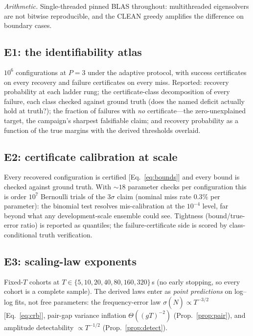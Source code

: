 \documentclass[twocolumn,preprintnumbers,amsmath,amssymb,pra,floatfix]{revtex4-2}
\begin{document}
\emph{Arithmetic.}  Single-threaded pinned BLAS throughout:
multithreaded eigensolvers are not bitwise reproducible, and the
CLEAN greedy amplifies the difference on boundary cases.

\subsection{E1: the identifiability atlas}
\label{sec:ensemble}

$10^{6}$ configurations at $P{=}3$ under the adaptive protocol, with
success certificates on every recovery and failure certificates on
every miss.  Reported: recovery probability at each ladder rung; the
certificate-class decomposition of every failure, each class checked
against ground truth (does the named deficit actually hold at
truth?); the fraction of failures with \emph{no} certificate---the
zero-unexplained target, the campaign's sharpest falsifiable claim;
and recovery probability as a function of the true margins with the
derived thresholds overlaid.






\subsection{E2: certificate calibration at scale}
\label{sec:e2}

Every recovered configuration is certified [Eq.~\eqref{eq:bounds}]
and every bound is checked against ground truth.  With $\sim\!18$
parameter checks per configuration this is order $10^{7}$ Bernoulli
trials of the $3\sigma$ claim (nominal miss rate $0.3\%$ per
parameter): the binomial test resolves mis-calibration at the
$10^{-4}$ level, far beyond what any development-scale ensemble could
see.  Tightness (bound/true-error ratio) is reported as quantiles;
the failure-certificate side is scored by class-conditional truth
verification.






\subsection{E3: scaling-law exponents}
\label{sec:e3}

Fixed-$T$ cohorts at $T\in\{5,10,20,40,80,160,320\}$\,s (no early
stopping, so every cohort is a complete sample).  The derived laws
enter as \emph{point predictions} on log--log fits, not free
parameters: the frequency-error law $\sigma(\hat N)\propto T^{-3/2}$
[Eq.~\eqref{eq:crb}], pair-gap variance inflation
$\Theta((gT)^{-2})$ (Prop.~\ref{prop:pair}), and amplitude
detectability $\propto T^{-1/2}$ (Prop.~\ref{prop:detect}).
\end{document}
